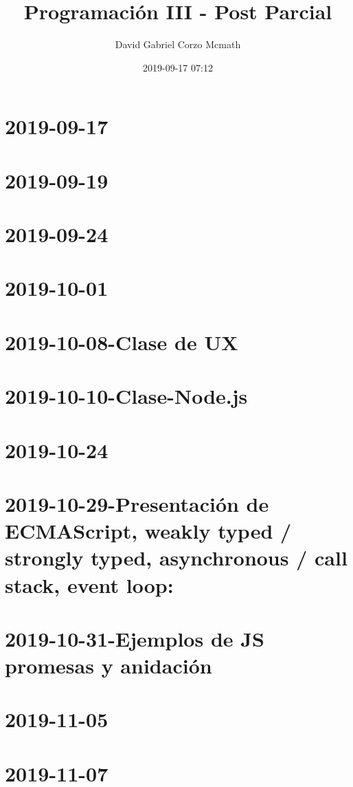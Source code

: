 \documentclass{book}
\author{David Gabriel Corzo Mcmath}
\title{Programación III - Post Parcial}
\date{2019-09-17 07:12}
\begin{document}
\maketitle
\tableofcontents

\chapter{2019-09-17}


\chapter{2019-09-19}


\chapter{2019-09-24}


\chapter{2019-10-01}


\chapter{2019-10-08-Clase de UX}


\chapter{2019-10-10-Clase-Node.js}


\chapter{2019-10-24}


\chapter{2019-10-29-Presentación de ECMAScript, weakly typed / strongly typed, asynchronous / call stack, event loop: }


\chapter{2019-10-31-Ejemplos de JS promesas y anidación}    


\chapter{2019-11-05}


\chapter{2019-11-07}

\end{document}
